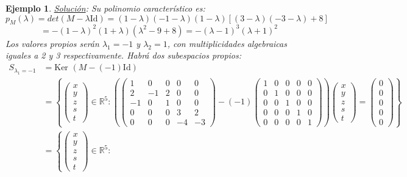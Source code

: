 \documentclass[12pt]{book}
\newtheorem{ejem}{Ejemplo}
\def\R{\mathbb{R}}
\begin{document}
{\begin{ejem}
{\underline{Soluci\'on}:
Su polinomio característico es:
$$p_M(\lambda)=det(M-\lambda \text{Id})=(1-\lambda)(-1-\lambda)(1-\lambda)[(3-\lambda)(-3-\lambda)+8]$$
$$=-(1-\lambda)^2(1+\lambda)(\lambda^2-9+8)=-(\lambda-1)^3(\lambda+1)^2$$
Los valores propios serán $\lambda_1=-1$ y $\lambda_2=1$, con multiplicidades algebraicas iguales a 2 y 3 respectivamente. Habrá dos subespacios propios:
\begin{align*}
 S_{\lambda_1=-1 }  &  =\text{Ker }(M-(-1)\text{Id})\\
         &  =\left\{\left(\begin{matrix}x\\ y \\ z \\ s \\ t \end{matrix}\right)\in\R^5:
         \left(\left(\begin{matrix}
         1 & 0 & 0 & 0 & 0 \\ 
         2 & -1 & 2 & 0 & 0 \\ 
         -1 & 0 & 1 & 0 & 0 \\ 
         0 & 0 & 0 & 3 & 2 \\ 
         0 & 0 & 0 & -4 & -3 
         \end{matrix}\right)-(-1)
         \left(\begin{matrix}
         1 & 0 & 0 & 0 & 0 \\ 
         0 & 1 & 0 & 0 & 0 \\ 
         0 & 0 & 1 & 0 & 0 \\ 
         0 & 0 & 0 & 1 & 0 \\ 
         0 & 0 & 0 & 0 & 1 
         \end{matrix}\right)\right)\left(\begin{matrix}x\\ y \\ z \\ s \\ t \end{matrix}\right)=\left(\begin{matrix}0\\ 0 \\ 0 \\ 0 \\ 0 \end{matrix}\right)\right\} \\
   &  =\left\{\left(\begin{matrix}x\\ y \\ z \\ s \\ t \end{matrix}\right)\in\R^5:

\end{align*}}
\end{ejem}}
\end{document}
